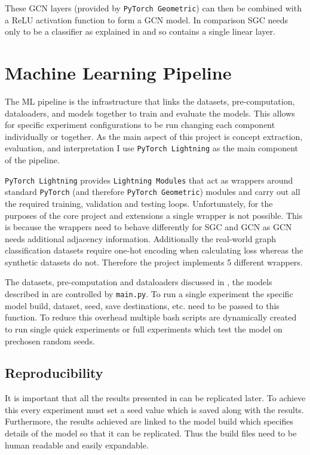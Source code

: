 These GCN layers (provided by \texttt{PyTorch Geometric}) can then be combined with a ReLU activation function to form a GCN model.
In comparison SGC needs only to be a classifier as explained in  and so contains a single linear layer.

\section{Machine Learning Pipeline}
\label{sec:pipeline}

The ML pipeline is the infrastructure that links the datasets, pre-computation, dataloaders, and models together to train and evaluate the models.
This allows for specific experiment configurations to be run changing each component individually or together.
As the main aspect of this project is concept extraction, evaluation, and interpretation I use \texttt{PyTorch Lightning} as the main component of the pipeline.

\texttt{PyTorch Lightning} provides \texttt{Lightning Modules} that act as wrappers around standard \texttt{PyTorch} (and therefore \texttt{PyTorch Geometric}) modules and carry out all the required training, validation and testing loops.
Unfortunately, for the purposes of the core project and extensions a single wrapper is not possible.
This is because the wrappers need to behave differently for SGC and GCN as GCN needs additional adjacency information.
Additionally the real-world graph classification datasets require one-hot encoding when calculating loss whereas the synthetic datasets do not.
Therefore the project implements 5 different wrappers.

The datasets, pre-computation and dataloaders discussed in , the models described in  are controlled by \texttt{main.py}.
To run a single experiment the specific model build, dataset, seed, save destinations, etc. need to be passed to this function.
To reduce this overhead multiple bash scripts are dynamically created to run single quick experiments or full experiments which test the model on prechosen random seeds.

\subsection{Reproducibility}
\label{sec:reproducibility}
It is important that all the results presented in  can be replicated later.
To achieve this every experiment must set a seed value which is saved along with the results.
Furthermore, the results achieved are linked to the model build 
which specifies details of the model so that it can be replicated.
Thus the build files need to be human readable and easily expandable.

